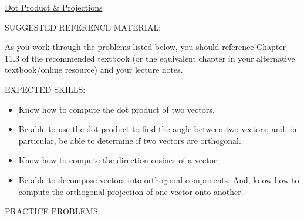 \documentclass[12pt]{article}
\begin{document}
\begin{center}
\underline{\LARGE{Dot Product \& Projections}}
\end{center}

\noindent SUGGESTED REFERENCE MATERIAL:

\bigskip

\noindent As you work through the problems listed below, you should reference Chapter 11.3 of the recommended textbook (or the equivalent chapter in your alternative textbook/online resource) and your lecture notes.

\bigskip

\noindent EXPECTED SKILLS:

\begin{itemize}

\item Know how to compute the dot product of two vectors. 

\item Be able to use the dot product to find the angle between two vectors;  and, in particular, be able to determine if two vectors are orthogonal.

\item  Know how to compute the direction cosines of a vector. 

\item Be able to decompose vectors into orthogonal components. And, know how to compute the orthogonal projection of one vector onto another.

\end{itemize}

\noindent PRACTICE PROBLEMS:

\medskip
\end{document}

